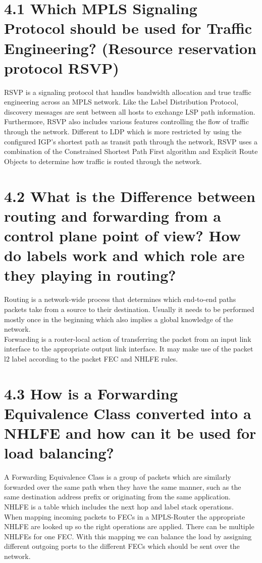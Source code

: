 \documentclass{article}
\begin{document}
	\pagestyle{fancy}
	\hfill
	
	\section*{4.1 Which MPLS Signaling Protocol should be used for Traffic Engineering? (Resource reservation protocol RSVP)}
	\begin{adjustwidth}{2em}{2em}
		RSVP is a signaling protocol that handles bandwidth allocation and true traffic engineering across an MPLS network. Like the Label Distribution Protocol, discovery messages are sent between all hosts to exchange LSP path information. Furthermore, RSVP also includes various features controlling the flow of traffic through the network. Different to LDP which is more restricted by using the configured IGP's shortest path as transit path through the network, RSVP uses a combination of the Constrained Shortest Path First algorithm and Explicit Route Objects to determine how traffic is routed through the network.
	\end{adjustwidth}
	
	\section*{4.2 What is the Difference between routing and forwarding from a control plane point of view? How do labels work and which role are they playing in routing?}
	\begin{adjustwidth}{2em}{2em}
		Routing is a network-wide process that determines which end-to-end paths packets take from a source to their destination. Usually it needs to be performed mostly once in the beginning which also implies a global knowledge of the network. \\
		Forwarding is a router-local action of transferring the packet from an input link interface to the appropriate output link interface. It may make use of the packet l2 label according to the packet FEC and NHLFE rules.
	\end{adjustwidth}
	
	\section*{4.3 How is a Forwarding Equivalence Class converted into a NHLFE and how can it be used for load balancing?}
	\begin{adjustwidth}{2em}{2em}
		A Forwarding Equivalence Class is a group of packets which are similarly forwarded over the same path when they have the same manner, such as the same destination address prefix or originating from the same application. \\
		NHLFE is a table which includes the next hop and label stack operations. \\
		When mapping incoming packets to FECs in a MPLS-Router the appropriate NHLFE are looked up so the right operations are applied. There can be multiple NHLFEs for one FEC. With this mapping we can balance the load by assigning different outgoing ports to the different FECs which should be sent over the network.
	\end{adjustwidth}
	
\end{document}
